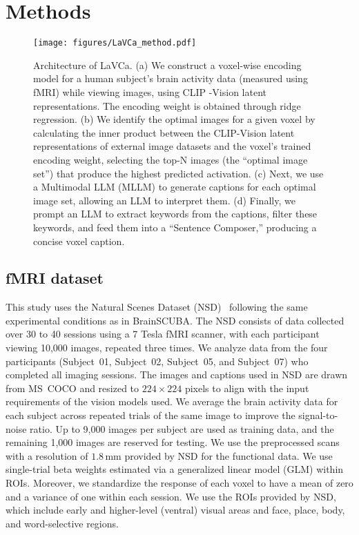\section{Methods}

\begin{figure*}[t]
  \centering
  \texttt{[image: figures/LaVCa\_method.pdf]}
  \vskip 0.1in %
  \caption{Architecture of LaVCa. (a) We construct a voxel-wise encoding model for a human subject’s brain activity data (measured using fMRI) while viewing images, using CLIP -Vision latent representations. The encoding weight is obtained through ridge regression. (b) We identify the optimal images for a given voxel by calculating the inner product between the CLIP-Vision latent representations of external image datasets and the voxel’s trained encoding weight, selecting the top-N images (the ``optimal image set'') that produce the highest predicted activation. (c) Next, we use a Multimodal LLM (MLLM) to generate captions for each optimal image set, allowing an LLM to interpret them. (d) Finally, we prompt an LLM to extract keywords from the captions, filter these keywords, and feed them into a ``Sentence Composer,'' producing a concise voxel caption.}
  \label{methods:fig1}
\end{figure*}

\subsection{fMRI dataset}
This study uses the Natural Scenes Dataset (NSD)~\cite{allen2022massive} following the same experimental conditions as in BrainSCUBA. The NSD consists of data collected over 30 to 40 sessions using a 7 Tesla fMRI scanner, with each participant viewing 10,000 images, repeated three times. We analyze data from the four participants (Subject~01, Subject~02, Subject~05, and Subject~07) who completed all imaging sessions.
The images and captions used in NSD are drawn from MS~COCO and resized to $224 \times 224$ pixels to align with the input requirements of the vision models used. We average the brain activity data for each subject across repeated trials of the same image to improve the signal-to-noise ratio. Up to 9,000 images per subject are used as training data, and the remaining 1,000 images are reserved for testing. We use the preprocessed scans with a resolution of $1.8\,\mathrm{mm}$ provided by NSD for the functional data. We use single-trial beta weights estimated via a generalized linear model (GLM) within ROIs. Moreover, we standardize the response of each voxel to have a mean of zero and a variance of one within each session. We use the ROIs provided by NSD, which include early and higher-level (ventral) visual areas and face, place, body, and word-selective regions.


